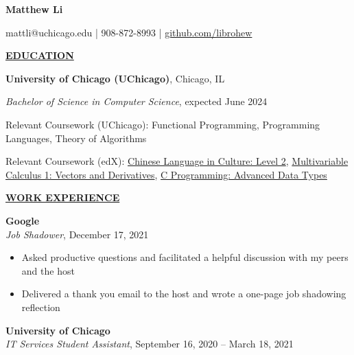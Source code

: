 \documentclass[
]{article}
\author{}
\date{\vspace{-2.5em}}
\providecommand{\tightlist}{%
  \setlength{\itemsep}{0pt}\setlength{\parskip}{0pt}}
\begin{document}

\begin{center}

\textbf{Matthew Li}

\end{center}

\begin{center}
mattli@uchicago.edu | 908-872-8993 | \href{https://www.github.com/librohew}{github.com/librohew}   
\end{center}

\textbf{\underline{EDUCATION}}

\textbf{University of Chicago (UChicago)}, Chicago, IL

\emph{Bachelor of Science in Computer Science}, expected June 2024


Relevant Coursework (UChicago): Functional Programming, %
Programming Languages, %
Theory of Algorithms

Relevant Coursework (edX): \href{https://courses.edx.org/certificates/dfd4b97d29cd408a985d6453a40d5424}{Chinese Language in Culture: Level 2}, %
\href{https://courses.edx.org/certificates/427a45b7df034c2a9fb085b0993bdec0}{Multivariable Calculus 1: Vectors and Derivatives}, \href{https://courses.edx.org/certificates/3ad917a8b6684325bc987ea776d75cfb}{C Programming: Advanced Data Types}

\textbf{\underline{WORK EXPERIENCE}}

\textbf{Google}\\
\emph{Job Shadower}, December 17, 2021

\begin{itemize}
\tightlist
\item
  Asked productive questions and facilitated a helpful discussion with my peers and the host
\end{itemize}

\begin{itemize}
\item
  Delivered a thank you email to the host and wrote a one-page job shadowing reflection  
\end{itemize}

\textbf{University of Chicago}\\
\emph{IT Services Student Assistant}, September 16, 2020 -- March 18,
2021
\end{document}
